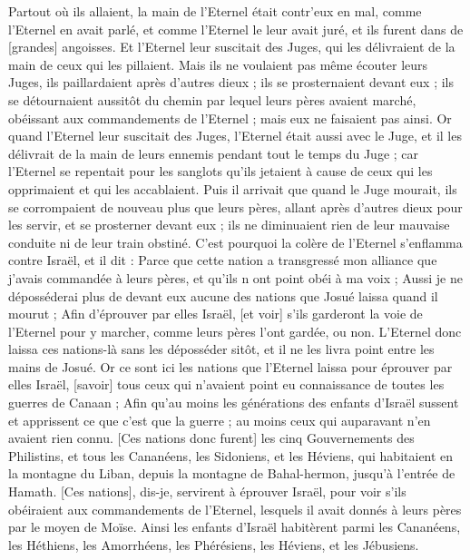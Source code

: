 \begin{multicols}{2}
Partout où ils allaient, la main de l'Eternel était contr'eux en mal, comme l'Eternel en avait parlé, et comme l'Eternel le leur avait juré, et ils furent dans de [grandes] angoisses.
Et l'Eternel leur suscitait des Juges, qui les délivraient de la main de ceux qui les pillaient.
Mais ils ne voulaient pas même écouter leurs Juges, ils paillardaient après d'autres dieux ; ils se prosternaient devant eux ; ils se détournaient aussitôt du chemin par lequel leurs pères avaient marché, obéissant aux commandements de l'Eternel ; mais eux ne faisaient pas ainsi.
Or quand l'Eternel leur suscitait des Juges, l'Eternel était aussi avec le Juge, et il les délivrait de la main de leurs ennemis pendant tout le temps du Juge ; car l'Eternel se repentait pour les sanglots qu'ils jetaient à cause de ceux qui les opprimaient et qui les accablaient.
Puis il arrivait que quand le Juge mourait, ils se corrompaient de nouveau plus que leurs pères, allant après d'autres dieux pour les servir, et se prosterner devant eux ; ils ne diminuaient rien de leur mauvaise conduite ni de leur train obstiné.
C'est pourquoi la colère de l'Eternel s'enflamma contre Israël, et il dit : Parce que cette nation a transgressé mon alliance que j'avais commandée à leurs pères, et qu'ils n ont point obéi à ma voix ;
Aussi je ne déposséderai plus de devant eux aucune des nations que Josué laissa quand il mourut ;
Afin d'éprouver par elles Israël, [et voir] s'ils garderont la voie de l'Eternel pour y marcher, comme leurs pères l'ont gardée, ou non.
L'Eternel donc laissa ces nations-là sans les déposséder sitôt, et il ne les livra point entre les mains de Josué.
\VerseOne{}Or ce sont ici les nations que l'Eternel laissa pour éprouver par elles Israël, [savoir] tous ceux qui n'avaient point eu connaissance de toutes les guerres de Canaan ;
Afin qu'au moins les générations des enfants d'Israël sussent et apprissent ce que c'est que la guerre ; au moins ceux qui auparavant n'en avaient rien connu.
[Ces nations donc furent] les cinq Gouvernements des Philistins, et tous les Cananéens, les Sidoniens, et les Héviens, qui habitaient en la montagne du Liban, depuis la montagne de Bahal-hermon, jusqu'à l'entrée de Hamath.
[Ces nations], dis-je, servirent à éprouver Israël, pour voir s'ils obéiraient aux commandements de l'Eternel, lesquels il avait donnés à leurs pères par le moyen de Moïse.
Ainsi les enfants d'Israël habitèrent parmi les Cananéens, les Héthiens, les Amorrhéens, les Phérésiens, les Héviens, et les Jébusiens.

\end{multicols}
